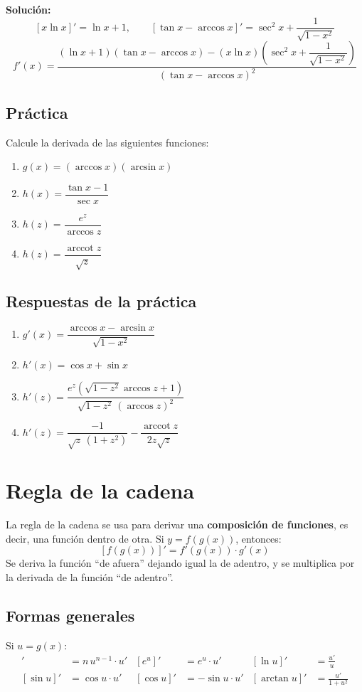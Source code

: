 \documentclass[12pt]{article}
\begin{document}
\textbf{Solución:}
\[
[x \ln x]' = \ln x + 1, \qquad [\tan x - \arccos x]' = \sec^2 x + \frac{1}{\sqrt{1 - x^2}}
\]
\[
f'(x) = \frac{(\ln x + 1)(\tan x - \arccos x) - (x \ln x)\left(\sec^2 x + \dfrac{1}{\sqrt{1 - x^2}}\right)}{(\tan x - \arccos x)^2}
\]

\subsection{Práctica}
Calcule la derivada de las siguientes funciones:
\begin{enumerate}
    \item $g(x) = (\arccos x)(\arcsin x)$
    \item $h(x) = \dfrac{\tan x - 1}{\sec x}$
    \item $h(z) = \dfrac{e^z}{\arccos z}$
    \item $h(z) = \dfrac{\operatorname{arccot} z}{\sqrt{z}}$
\end{enumerate}

\subsection{Respuestas de la práctica}
\begin{enumerate}
    \item $g'(x) = \dfrac{\arccos x - \arcsin x}{\sqrt{1 - x^2}}$
    \item $h'(x) = \cos x + \sin x$
    \item $h'(z) = \dfrac{e^z\left(\sqrt{1 - z^2}\arccos z + 1\right)}{\sqrt{1 - z^2}\,(\arccos z)^2}$
    \item $h'(z) = \dfrac{-1}{\sqrt{z}\,(1 + z^2)} - \dfrac{\operatorname{arccot} z}{2z\sqrt{z}}$
\end{enumerate}

\section{Regla de la cadena}

La regla de la cadena se usa para derivar una \textbf{composición de funciones}, es decir, una función dentro de otra. Si $y = f(g(x))$, entonces:
\[
[f(g(x))]' = f'(g(x)) \cdot g'(x)
\]
Se deriva la función ``de afuera'' dejando igual la de adentro, y se multiplica por la derivada de la función ``de adentro''.

\subsection{Formas generales}
Si $u = g(x)$:
\begin{align*}
[u^n]' &= n\,u^{n-1} \cdot u' & [e^u]' &= e^u \cdot u' & [\ln u]' &= \frac{u'}{u} \\
[\sin u]' &= \cos u \cdot u' & [\cos u]' &= -\sin u \cdot u' & [\arctan u]' &= \frac{u'}{1 + u^2}
\end{align*}
\end{document}
